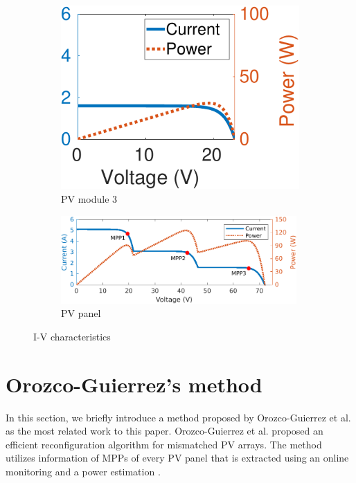 \documentclass[conference]{pvsctran}
\begin{document}
\begin{figure}
\begin{subfigure}[b]{2.7cm}
        \includegraphics[width=\linewidth]{../fig/m_3.png}
        \caption{PV module 3}
    \end{subfigure}
    \hfill
    \begin{subfigure}[b]{9cm}
        \centering
        \vspace{3mm}
        \includegraphics[width=9cm]{../fig/panel.png}
        \caption{PV panel}
    \end{subfigure}
    \caption{I-V characteristics}
    \label{fig:IV}
\end{figure}






\section{Orozco-Guierrez's method}\label{Sec3}
In this section, we briefly introduce a method proposed by Orozco-Guierrez et al.\cite{orozco2016optimized} as the most related work to this paper.
Orozco-Guierrez et al. proposed an efficient reconfiguration algorithm for mismatched PV arrays. 
The method utilizes information of MPPs of every PV panel that is extracted using an online monitoring \cite{carotenuto2014online} and a power estimation \cite{orozco2015fast}.
\end{document}

